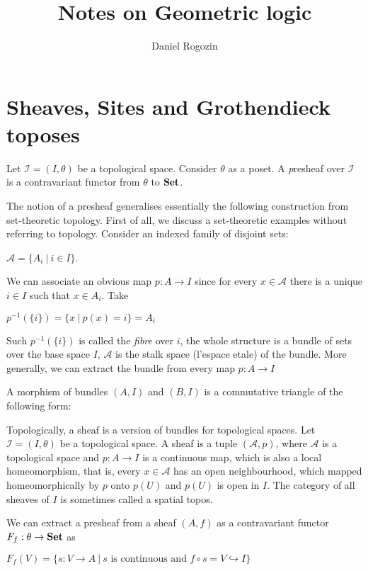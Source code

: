 \documentclass[a4paper]{article}
\author{Daniel Rogozin}
\date{}
\title{Notes on Geometric logic}
\theoremstyle{defin}
\theoremstyle{theorem}
\theoremstyle{claim}
\theoremstyle{prop}
\theoremstyle{lemma}
\theoremstyle{fact}
\theoremstyle{ex}
\theoremstyle{col}
\begin{document}
\maketitle

\section{Sheaves, Sites and Grothendieck toposes}

Let $\mathcal{I} = (I, \theta)$ be a topological space. Consider $\theta$ as a poset. A {\emph presheaf} over $\mathcal{I}$ is a contravariant functor from $\theta$ to ${\bf Set}$.

The notion of a presheaf generalises essentially the following construction from set-theoretic topology. First of all, we discuss a set-theoretic examples without referring to topology. Consider an indexed family of disjoint sets:
\begin{center}
$\mathcal{A} = \{ A_i \: | \: i \in I \}$.
\end{center}
We can associate an obvious map $p : A \to I$ since for every $x \in \mathcal{A}$ there is a unique $i \in I$ such that $x \in A_i$. Take

\begin{center}
$p^{-1}(\{ i \}) = \{ x \: | \: p(x) = i\} = A_i$
\end{center}

Such $p^{-1}(\{ i \})$ is called the \emph{fibre} over $i$, the whole structure is a bundle of sets over the base space $I$, $\mathcal{A}$ is the stalk space (l'espace etale) of the bundle. More generally, we can extract the bundle from every map $p : A \to I$

A morphism of bundles $(A, I)$ and $(B, I)$ is a commutative triangle of the following form:


Topologically, a sheaf is a version of bundles for topological spaces. Let $\mathcal{I} = (I, \theta)$ be a topological space. A sheaf is a tuple $(\mathcal{A}, p)$, where $\mathcal{A}$ is a topological space and $p : A \to I$ is a continuous map, which is also a local homeomorphism, that is, every $x \in \mathcal{A}$ has an open neighbourhood, which mapped homeomorphically by $p$ onto $p(U)$ and $p(U)$ is open in $I$. The category of all sheaves of $I$ is sometimes called a spatial topos.

We can extract a presheaf from a sheaf $(A, f)$ as a contravariant functor $F_f : \theta \to {\bf Set}$ as
\begin{center}
$F_f(V) = \{ s : V \to A \: | \: \text{$s$ is continuous and $f \circ s = V \hookrightarrow I $}\}$
\end{center}
\end{document}
